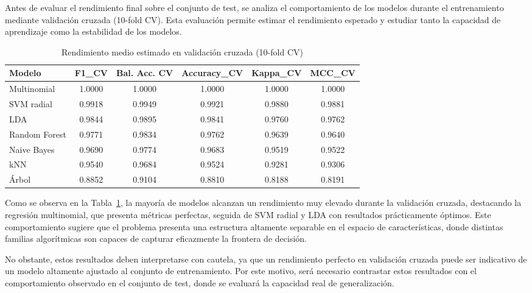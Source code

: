 Antes de evaluar el rendimiento final sobre el conjunto de test, se analiza el comportamiento de los modelos durante el entrenamiento mediante validación cruzada (10-fold CV). Esta evaluación permite estimar el rendimiento esperado y estudiar tanto la capacidad de aprendizaje como la estabilidad de los modelos.

\vspace{0.3cm}

\begin{table}[h]
\centering
\caption{Rendimiento medio estimado en validación cruzada (10-fold CV)}
\vspace{0.2cm}
\begin{tabular}{l c c c c c}
\hline
\textbf{Modelo} & \textbf{F1\_CV} & \textbf{Bal. Acc. CV} & \textbf{Accuracy\_CV} & \textbf{Kappa\_CV} & \textbf{MCC\_CV} \\
\hline
Multinomial & 1.0000 & 1.0000 & 1.0000 & 1.0000 & 1.0000 \\
SVM radial & 0.9918 & 0.9949 & 0.9921 & 0.9880 & 0.9881 \\
LDA & 0.9844 & 0.9895 & 0.9841 & 0.9760 & 0.9762 \\
Random Forest & 0.9771 & 0.9834 & 0.9762 & 0.9639 & 0.9640 \\
Naive Bayes & 0.9690 & 0.9774 & 0.9683 & 0.9519 & 0.9522 \\
kNN & 0.9540 & 0.9684 & 0.9524 & 0.9281 & 0.9306 \\
Árbol & 0.8852 & 0.9104 & 0.8810 & 0.8188 & 0.8191 \\
\hline
\end{tabular}
\label{tab:cv_metricas}
\end{table}

\vspace{0.3cm}

Como se observa en la Tabla~\ref{tab:cv_metricas}, la mayoría de modelos alcanzan un rendimiento muy elevado durante la 
validación cruzada, destacando la regresión multinomial, que presenta métricas perfectas, seguida de SVM radial y LDA con 
resultados prácticamente óptimos. Este comportamiento sugiere que el problema presenta una estructura altamente separable 
en el espacio de características, donde distintas familias algorítmicas son capaces de capturar eficazmente la frontera de decisión.

No obstante, estos resultados deben interpretarse con cautela, ya que un rendimiento perfecto en validación cruzada puede 
ser indicativo de un modelo altamente ajustado al conjunto de entrenamiento. Por este motivo, será necesario contrastar 
estos resultados con el comportamiento observado en el conjunto de test, donde se evaluará la capacidad real de generalización.


